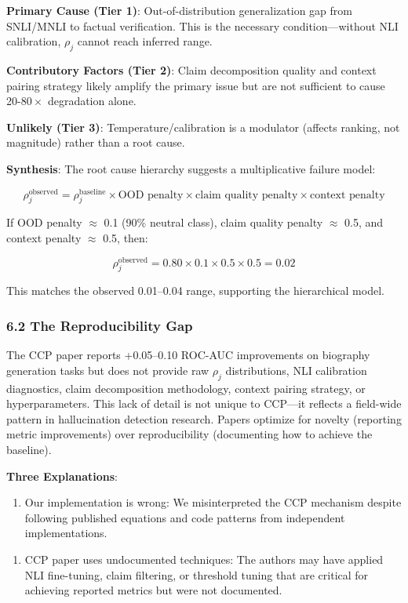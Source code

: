 \textbf{Primary Cause (Tier 1)}: Out-of-distribution generalization gap from SNLI/MNLI to factual verification. This is the necessary condition---without NLI calibration, $\rho_j$ cannot reach inferred range.

\textbf{Contributory Factors (Tier 2)}: Claim decomposition quality and context pairing strategy likely amplify the primary issue but are not sufficient to cause 20-$80\times$ degradation alone.

\textbf{Unlikely (Tier 3)}: Temperature/calibration is a modulator (affects ranking, not magnitude) rather than a root cause.

\textbf{Synthesis}: The root cause hierarchy suggests a multiplicative failure model:

$$\rho_j^{\text{observed}} = \rho_j^{\text{baseline}} \times \text{OOD penalty} \times \text{claim quality penalty} \times \text{context penalty}$$

If OOD penalty $\approx$ 0.1 (90\% neutral class), claim quality penalty $\approx$ 0.5, and context penalty $\approx$ 0.5, then:

$$\rho_j^{\text{observed}} = 0.80 \times 0.1 \times 0.5 \times 0.5 = 0.02$$

This matches the observed 0.01--0.04 range, supporting the hierarchical model.

\subsubsection{6.2 The Reproducibility Gap}

The CCP paper reports +0.05--0.10 ROC-AUC improvements on biography generation tasks but does not provide raw $\rho_j$ distributions, NLI calibration diagnostics, claim decomposition methodology, context pairing strategy, or hyperparameters. This lack of detail is not unique to CCP---it reflects a field-wide pattern in hallucination detection research. Papers optimize for novelty (reporting metric improvements) over reproducibility (documenting how to achieve the baseline).

\textbf{Three Explanations}:

\begin{enumerate}
\item Our implementation is wrong: We misinterpreted the CCP mechanism despite following published equations and code patterns from independent implementations.
\end{enumerate}

\begin{enumerate}
\item CCP paper uses undocumented techniques: The authors may have applied NLI fine-tuning, claim filtering, or threshold tuning that are critical for achieving reported metrics but were not documented.
\end{enumerate}

